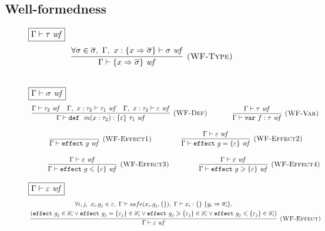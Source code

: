 \subsection{Well-formedness}
\begin{figure}[!t]
\flushleft
\footnotesize{

$\fbox{$\Gamma \vdash \tau~\mathit{wf}$}$
\[
\begin{array}{c}
\hspace{-2pt}
\infer[\textsc{(WF-Type)}]
  {\Gamma \vdash \{ x \Rightarrow \overline{\sigma} \}~\mathit{wf}}
  {\forall \sigma \in \overline{\sigma},~\Gamma,~x : \{ x \Rightarrow \overline{\sigma} \} \vdash \sigma~\mathit{wf}}\\[3ex]
\end{array}
\]

$\fbox{$\Gamma \vdash \sigma~\mathit{wf}$}$
\[
\begin{array}{c}
\hspace{-2pt}
\infer[\textsc{(WF-Def)}]
  {\Gamma \vdash \keyw{def}~ m(x : \tau_2) : \{ \varepsilon \}~\tau_1~\mathit{wf}}
  {\Gamma \vdash \tau_2~\mathit{wf} & \Gamma,~x : \tau_2 \vdash \tau_1~\mathit{wf} & \Gamma,~x : \tau_2 \vdash \varepsilon~\mathit{wf}} \quad \quad
~~~~~
\infer[\textsc{(WF-Var)}]
  {\Gamma \vdash \keyw{var} f : \tau~\mathit{wf}}
  {\Gamma \vdash \tau~\mathit{wf}}\\[3ex]
\infer[\textsc{(WF-Effect1)}]
  {\Gamma \vdash \keyw{effect} g~\mathit{wf}}
  {} \quad \quad
~~~~~~~
\infer[\textsc{(WF-Effect2)}]
  {\Gamma \vdash \keyw{effect} g = \{ \varepsilon \}~\mathit{wf}}
  {\Gamma \vdash \varepsilon~\mathit{wf}}\\[3ex]
~~~~~~~
\infer[\textsc{(WF-Effect3)}]
  {\Gamma \vdash \keyw{effect} g \leqslant \{\varepsilon\} \ \mathit{wf}}
  {\Gamma \vdash \varepsilon\  \mathit{wf}} \quad \quad
~~~~~~~
\infer[\textsc{(WF-Effect4)}]
  {\Gamma \vdash \keyw{effect} g \geqslant \{\varepsilon\} \ \mathit{wf}}
  {\Gamma \vdash \varepsilon\  \mathit{wf}} %
\end{array}
\]

$\fbox{$\Gamma \vdash \varepsilon~\mathit{wf}$}$
\[
\begin{array}{c}
\hspace{-2pt}
\infer[\textsc{(WF-Effect)}]
  {\Gamma \vdash \varepsilon~\mathit{wf}}
  {\begin{gathered} \forall i,j,~x_i.g_j \in \varepsilon,\ \Gamma \vdash safe(x_i.g_j, \{\}), ~\Gamma \vdash x_i : \{ \}~\{ y_i \Rightarrow \overline{\sigma_i} \}, \\(\keyw{effect} g_j \in \overline{\sigma_i} \vee \keyw{effect} g_j = \{ \varepsilon_j \} \in \overline{\sigma_i} \vee \keyw{effect} g_j \geqslant \{ \varepsilon_j \} \in \overline{\sigma_i} \vee \keyw{effect} g_j \leqslant \{ \varepsilon_j \}\in \overline{\sigma_i}) \end{gathered}}\\[3ex]
\end{array}
\]


}
\end{figure}
